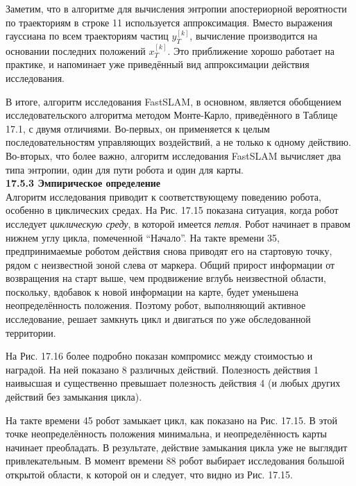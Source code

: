 \documentclass[10pt,a4paper]{article}
\begin{document}
Заметим, что в алгоритме для вычисления энтропии апостериорной вероятности по траекториям в строке 11 используется аппроксимация. Вместо  выражения гауссиана по всем траекториям частиц $y_T^{[k]}$, вычисление производится на основании последних положений $x_T^{[k]}$.
Это приближение хорошо работает на практике, и напоминает уже приведённый вид аппроксимации действия исследования.

В итоге, алгоритм исследования FastSLAM, в основном, является обобщением исследовательского алгоритма методом Монте-Карло, приведённого в Таблице 17.1, с двумя отличиями. Во-первых, он применяется к целым последовательностям управляющих воздействий, а не только к одному действию. Во-вторых, что более важно, алгоритм исследования FastSLAM вычисляет два типа энтропии, один для пути робота и один для карты.\\

\textbf{17.5.3	Эмпирическое определение}\\

Алгоритм исследования приводит к соответствующему поведению робота, особенно в циклических средах. На Рис. 17.15 показана ситуация, когда робот исследует \textit{циклическую среду}, в которой имеется \textit{петля}. Робот начинает в правом нижнем углу цикла, помеченной “Начало”. На такте времени 35, предпринимаемые роботом действия снова приводят его на стартовую точку, рядом с неизвестной зоной слева от маркера. Общий прирост информации от возвращения на старт выше, чем продвижение вглубь неизвестной области, поскольку, вдобавок к новой информации на карте, будет уменьшена неопределённость положения. Поэтому робот, выполняющий активное исследование, решает замкнуть цикл и двигаться по уже обследованной территории.

На Рис. 17.16 более подробно показан компромисс между стоимостью и наградой. На ней показано 8 различных действий. Полезность действия 1 наивысшая и существенно превышает полезность действия 4 (и любых других действий без замыкания цикла).

На такте времени 45 робот замыкает цикл, как показано на Рис. 17.15. В этой точке неопределённость положения минимальна, и неопределённость карты начинает преобладать. В результате, действие замыкания цикла уже не выглядит привлекательным. В момент времени 88 робот выбирает исследования большой открытой области, к которой он и следует, что видно из Рис. 17.15.
\end{document}
